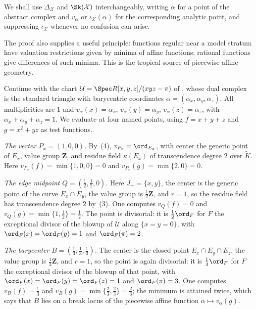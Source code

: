
We shall use $\Delta_{\mathcal X}$ and $\Sk(\mathcal X)$
interchangeably, writing $\alpha$ for a point of the abstract complex and
$v_\alpha$ or $\iota_{\mathcal X}(\alpha)$ for the corresponding
analytic point, and suppressing $\iota_{\mathcal X}$ whenever no confusion
can arise.

The proof also supplies a useful principle: functions regular near a model
stratum have valuation restrictions given by minima of affine functions;
rational functions give differences of such minima. This is the tropical
source of piecewise affine geometry.

\begin{example}
\label{ex:monomial-triangle-points}
Continue with the chart $\mathcal U=\Spec R[x,y,z]/(xyz-\pi)$ of
, whose dual complex is the standard
triangle with barycentric coordinates
$\alpha=(\alpha_x,\alpha_y,\alpha_z)$. All multiplicities are $1$ and
$v_\alpha(x)=\alpha_x$, $v_\alpha(y)=\alpha_y$,
$v_\alpha(z)=\alpha_z$, with $\alpha_x+\alpha_y+\alpha_z=1$. We evaluate
at four named points, using $f=x+y+z$ and $g=x^2+yz$ as test functions.

\emph{The vertex $P_x=(1,0,0)$.} By
\,(4), $v_{P_x}=\ord_{E_x}$, with
center the generic point of $E_x$, value group $\mathbf Z$, and residue
field $\kappa(E_x)$ of transcendence degree $2$ over $\widetilde K$.
Here $v_{P_x}(f)=\min\{1,0,0\}=0$ and $v_{P_x}(g)=\min\{2,0\}=0$.

\emph{The edge midpoint $Q=(\tfrac12,\tfrac12,0)$.} Here
$J_+=\{x,y\}$, the center is the generic point of the curve
$E_x\cap E_y$, the value group is $\tfrac12\mathbf Z$, and $r=1$, so
the residue field has transcendence degree $2$ by
\,(3). One computes
$v_Q(f)=0$ and $v_Q(g)=\min\{1,\tfrac12\}=\tfrac12$. The point is
divisorial: it is $\tfrac12\ord_F$ for $F$ the exceptional divisor of
the blowup of $\mathcal U$ along $\{x=y=0\}$, with
$\ord_F(x)=\ord_F(y)=1$ and $\ord_F(\pi)=2$.

\emph{The barycenter $B=(\tfrac13,\tfrac13,\tfrac13)$.} The center is the
closed point $E_x\cap E_y\cap E_z$, the value group is
$\tfrac13\mathbf Z$, and $r=1$, so the point is again divisorial: it is
$\tfrac13\ord_F$ for $F$ the exceptional divisor of the blowup of that
point, with $\ord_F(x)=\ord_F(y)=\ord_F(z)=1$ and $\ord_F(\pi)=3$. One
computes $v_B(f)=\tfrac13$ and
$v_B(g)=\min\{\tfrac23,\tfrac23\}=\tfrac23$; the minimum is attained
twice, which says that $B$ lies on a break locus of the piecewise affine
function $\alpha\mapsto v_\alpha(g)$.


\end{example}

